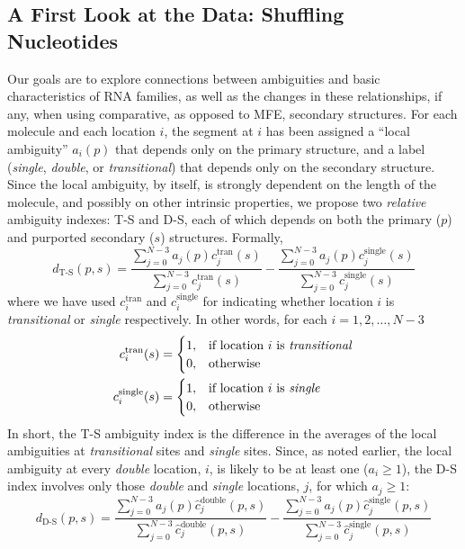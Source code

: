 \documentclass[10pt,letterpaper]{article}
\begin{document}
\subsection*{A First Look at the Data: Shuffling Nucleotides}
Our goals are to explore connections between ambiguities and basic characteristics of RNA families, as well as the changes in these relationships, if any, when using comparative, as opposed to MFE, secondary structures.
For each molecule and each location $i$, the segment at $i$ has been assigned a ``local ambiguity'' $a_i(p)$ that depends only on the primary structure, and a label ({\it single}, {\it double}, or {\it transitional}) that depends only on the secondary structure. Since the local ambiguity, by itself, is strongly dependent on the length of the molecule, and possibly on other intrinsic properties,
we propose two {\em relative} ambiguity indexes: T-S and D-S, each of which depends on both the primary ($p$) and purported secondary ($s$) structures. Formally,
\begin{equation}
	d_\text{T-S}(p, s) = \frac
	{\sum_{j = 0}^{N - 3} a_j (p) 
	c^{\text{tran}}_j (s)}
	{\sum_{j = 0}^{N - 3} 
	c^{\text{tran}}_j (s)} - 
	\frac
	{\sum_{j = 0}^{N - 3} a_j (p) c_j^{\text{single}} (s)}
	{\sum_{j = 0}^{N - 3} c_j^{\text{single}} (s)}
\end{equation}
where we have used
$c_i^{\text{tran}}$ and $c_i^{\text{single}}$ for indicating whether location $i$ is {\it transitional} or {\it single} respectively. In other words, for each $i=1,2,\ldots,N-3$
\begin{align}
	c_i^{\text{tran}}(s) &=
	\begin{cases}
		1, & \text{if location $i$ is \textit{transitional}} \\
		0, & \text{otherwise}
	\end{cases} \\
	c_i^{\text{single}}(s) &=
	\begin{cases}
		1, & \text{if location $i$ is \textit{single}} \\
		0, & \text{otherwise}
	\end{cases}
\end{align}
In short, the T-S ambiguity index is the difference in the averages of the local ambiguities at {\em transitional} sites and {\em single} sites.
Since, as noted earlier, the local ambiguity at every {\em double} location, $i$, 
is likely to be at least one ($a_i\geq 1$), the D-S index involves only those {\em double} and {\em single} locations, $j$, for which $a_j\geq 1$:
\begin{equation}
	d_\text{D-S}(p, s) = \frac
	{\sum_{j = 0}^{N - 3} a_j (p) 
	\hat{c}^{\text{double}}_j (p, s)}
	{\sum_{j = 0}^{N - 3} 
	\hat{c}^{\text{double}}_j (p, s)} - 
	\frac
	{\sum_{j = 0}^{N - 3} a_j (p) \hat{c}_j^{\text{single}} (p,s)}
	{\sum_{j = 0}^{N - 3} \hat{c}_j^{\text{single}} (p,s)}
\end{equation}
\end{document}
